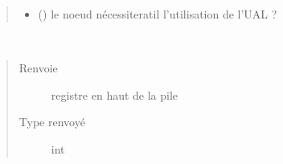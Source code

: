 \documentclass[letterpaper,10pt,french]{sphinxmanual}
\begin{document}
\begin{fulllineitems}
\begin{fulllineitems}
\begin{quote}
\begin{description}
\begin{itemize}
\item {} 
 () \textendash{} le noeud nécessitera\sphinxhyphen{}t\sphinxhyphen{}il l’utilisation de l’UAL ?

\end{itemize}

\end{description}\end{quote}

\end{fulllineitems}


\begin{fulllineitems}
\label{\detokenize{compileexpressionmanager:compileexpressionmanager.CompileExpressionManager.getResultRegister}}~\begin{quote}\begin{description}
\item[{Renvoie}] \leavevmode
registre en haut de la pile

\item[{Type renvoyé}] \leavevmode
int

\end{description}\end{quote}

\end{fulllineitems}



\end{fulllineitems}
\end{document}
